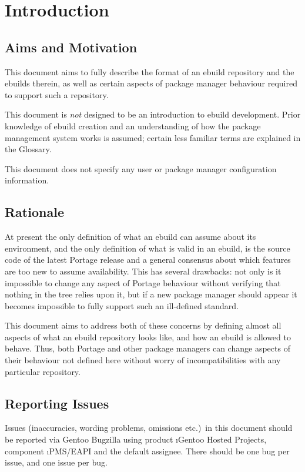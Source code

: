 \chapter{Introduction}

\section{Aims and Motivation}

This document aims to fully describe the format of an ebuild repository and the ebuilds therein, as
well as certain aspects of package manager behaviour required to support such a repository.

This document is \emph{not} designed to be an introduction to ebuild development. Prior knowledge of
ebuild creation and an understanding of how the package management system works is assumed; certain
less familiar terms are explained in the Glossary.

This document does not specify any user or package manager configuration information.

\section{Rationale}

At present the only definition of what an ebuild can assume about its environment,
and the only definition of what is valid in an ebuild, is the source code of the latest Portage release
and a general consensus about which features are too new to assume availability. This has several
drawbacks: not only is it impossible to change any aspect of Portage behaviour without verifying
that nothing in the tree relies upon it, but if a new package manager should appear it becomes
impossible to fully support such an ill-defined standard.

This document aims to address both of these concerns by defining almost all aspects of what an
ebuild repository looks like, and how an ebuild is allowed to behave. Thus, both Portage and other
package managers can change aspects of their behaviour not defined here without worry of
incompatibilities with any particular repository.

\section{Reporting Issues}

Issues (inaccuracies, wording problems, omissions etc.)\ in this document should be reported via
Gentoo Bugzilla using product \i{Gentoo Hosted Projects}, component \i{PMS/EAPI} and the default
assignee. There should be one bug per issue, and one issue per bug.


